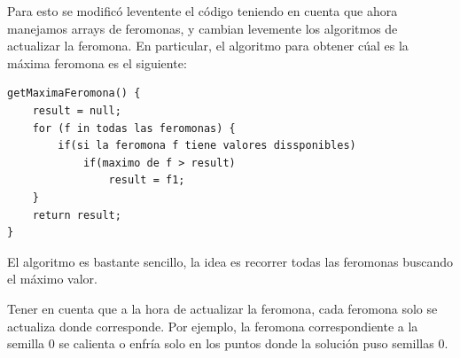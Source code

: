 Para esto se modific\'o leventente el c\'odigo teniendo en cuenta que ahora manejamos arrays de feromonas, y cambian levemente los algoritmos de actualizar la feromona. En particular, el algoritmo para obtener c\'ual es la m\'axima feromona es el siguiente:


\begin{verbatim}
getMaximaFeromona() {
    result = null;
    for (f in todas las feromonas) {
        if(si la feromona f tiene valores dissponibles)
            if(maximo de f > result)
                result = f1;
    }
    return result;
}
\end{verbatim}

El algoritmo es bastante sencillo, la idea es recorrer todas las feromonas buscando el m\'aximo valor. 

Tener en cuenta que a la hora de actualizar la feromona, cada feromona solo se actualiza donde corresponde. Por ejemplo,  la feromona correspondiente a la semilla 0 se calienta o enfr\'ia solo en los puntos donde la soluci\'on puso semillas 0. 